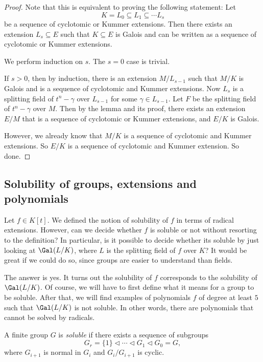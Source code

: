 \documentclass[a4paper]{article}
\begin{document}
\begin{proof}
  Note that this is equivalent to proving the following statement: Let
  \[
    K = L_0 \subseteq L_1 \subseteq \cdots L_s
  \]
  be a sequence of cyclotomic or Kummer extensions. Then there exists an extension $L_s \subseteq E$ such that $K \subseteq E$ is Galois and can be written as a sequence of cyclotomic or Kummer extensions.

  We perform induction on $s$. The $s = 0$ case is trivial.

  If $s > 0$, then by induction, there is an extension $M/L_{s - 1}$ such that $M/K$ is Galois and is a sequence of cyclotomic and Kummer extensions. Now $L_s$ is a splitting field of $t^n - \gamma$ over $L_{s - 1}$ for some $\gamma \in L_{s - 1}$. Let $F$ be the splitting field of $t^n - \gamma$ over $M$. Then by the lemma and its proof, there exists an extension $E/M$ that is a sequence of cyclotomic or Kummer extensions, and $E/K$ is Galois.
  \begin{center}
  \end{center}
  However, we already know that $M/K$ is a sequence of cyclotomic and Kummer extensions. So $E/K$ is a sequence of cyclotomic and Kummer extension. So done.
\end{proof}

\subsection{Solubility of groups, extensions and polynomials}
Let $f \in K[t]$. We defined the notion of solubility of $f$ in terms of radical extensions. However, can we decide whether $f$ is soluble or not without resorting to the definition? In particular, is it possible to decide whether its soluble by just looking at $\Gal(L/K)$, where $L$ is the splitting field of $f$ over $K$? It would be great if we could do so, since groups are easier to understand than fields.

The answer is yes. It turns out the solubility of $f$ corresponds to the solubility of $\Gal(L/K)$. Of course, we will have to first define what it means for a group to be soluble. After that, we will find examples of polynomials $f$ of degree at least $5$ such that $\Gal(L/K)$ is not soluble. In other words, there are polynomials that cannot be solved by radicals.
\begin{defi}
  A finite group $G$ is \emph{soluble} if there exists a sequence of subgroups
  \[
    G_r = \{1\} \lhd \cdots \lhd G_1 \lhd G_0 = G,
  \]
  where $G_{i + 1}$ is normal in $G_i$ and $G_i/G_{i + 1}$ is cyclic.
\end{defi}
\end{document}
